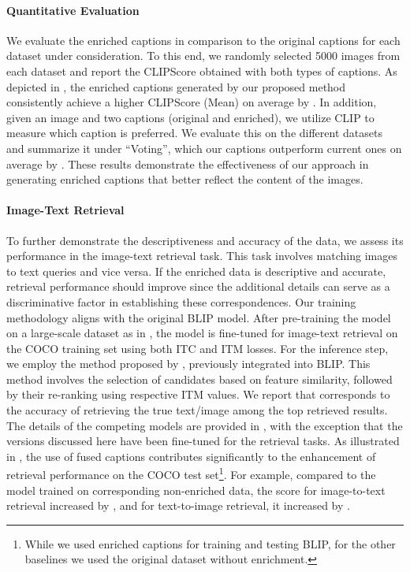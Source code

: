 \vspace{-10pt}
\paragraph{Quantitative Evaluation}
We evaluate the enriched captions in comparison to the original captions for each dataset under consideration. To this end, we randomly selected 5000 images from each dataset and report the CLIPScore obtained with both types of captions.
As depicted in , the enriched captions generated by our proposed method consistently achieve a higher CLIPScore (Mean) on average by .
In addition, given an image and two captions (original and enriched), we utilize CLIP to measure which caption is preferred. We evaluate this on the different datasets and summarize it under ``Voting'', which our captions outperform current ones on average by .
These results demonstrate the effectiveness of our approach in generating enriched captions that better reflect the content of the images.
\vspace{-20pt}

\paragraph{Image-Text Retrieval}\label{Se:image-text-retrieval}
To further demonstrate the descriptiveness and accuracy of the \fusecap{} data, we assess its performance in the image-text retrieval task.
This task involves matching images to text queries and vice versa.
If the enriched data is descriptive and accurate, retrieval performance should improve since the additional details can serve as a discriminative factor in establishing these correspondences.
Our training methodology aligns with the original BLIP model.
After pre-training the model on a large-scale dataset as in , the model is fine-tuned for image-text retrieval on the COCO training set using both ITC and ITM losses.
For the inference step, we employ the method proposed by \cite{li2021align}, previously integrated into BLIP.
This method involves the selection of  candidates based on feature similarity, followed by their re-ranking using respective ITM values.
We report  that corresponds to the accuracy of retrieving the true text/image among the top  retrieved results.
The details of the competing models are provided in , with the exception that the versions discussed here have been fine-tuned for the retrieval tasks.
As illustrated in , the use of fused captions contributes significantly to the enhancement of retrieval performance on the COCO test set\footnote{While we used enriched captions for training and testing BLIP, for the other baselines we used the original dataset without enrichment.}.
For example, compared to the model trained on corresponding non-enriched data, the  score for image-to-text retrieval increased by , and for text-to-image retrieval, it increased by .


